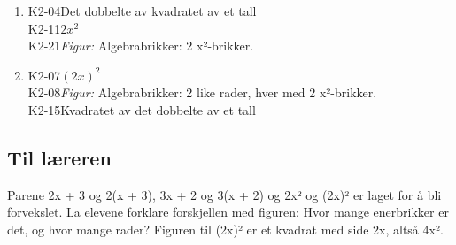 \documentclass[11pt,a4paper]{article}
\begin{document}
\begin{enumerate}[leftmargin=1.6em, itemsep=0.7em]
\item \begin{minipage}[t]{\linewidth}\textsf{\small K2-04}\quad Det dobbelte av kvadratet av et tall \\ \textsf{\small K2-11}\quad $2x^2$ \\ \textsf{\small K2-21}\quad \emph{Figur:} Algebrabrikker: 2 x²-brikker.\end{minipage}
\item \begin{minipage}[t]{\linewidth}\textsf{\small K2-07}\quad $(2x)^2$ \\ \textsf{\small K2-08}\quad \emph{Figur:} Algebrabrikker: 2 like rader, hver med 2 x²-brikker. \\ \textsf{\small K2-15}\quad Kvadratet av det dobbelte av et tall\end{minipage}
\end{enumerate}
\subsection*{Til læreren}
Parene 2x + 3 og 2(x + 3), 3x + 2 og 3(x + 2) og 2x² og (2x)² er laget for å bli forvekslet. La elevene forklare forskjellen med figuren: Hvor mange enerbrikker er det, og hvor mange rader? Figuren til (2x)² er et kvadrat med side 2x, altså 4x².
\end{document}
